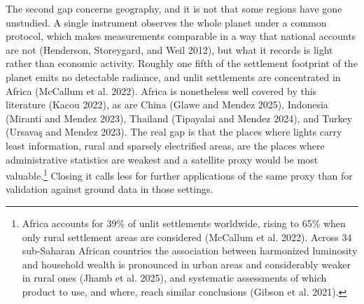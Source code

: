 \documentclass[
  letterpaper,
  DIV=11,
  numbers=noendperiod]{scrartcl}
\begin{document}
The second gap concerns geography, and it is not that some regions have
gone unstudied. A single instrument observes the whole planet under a
common protocol, which makes measurements comparable in a way that
national accounts are not (Henderson, Storeygard, and Weil 2012), but
what it records is light rather than economic activity. Roughly one
fifth of the settlement footprint of the planet emits no detectable
radiance, and unlit settlements are concentrated in Africa (McCallum et
al. 2022). Africa is nonetheless well covered by this literature (Kacou
2022), as are China (Glawe and Mendez 2025), Indonesia (Miranti and
Mendez 2023), Thailand (Tipayalai and Mendez 2024), and Turkey (Ursavaş
and Mendez 2023). The real gap is that the places where lights carry
least information, rural and sparsely electrified areas, are the places
where administrative statistics are weakest and a satellite proxy would
be most valuable.\footnote{Africa accounts for 39\% of unlit settlements
  worldwide, rising to 65\% when only rural settlement areas are
  considered (McCallum et al. 2022). Across 34 sub-Saharan African
  countries the association between harmonized luminosity and household
  wealth is pronounced in urban areas and considerably weaker in rural
  ones (Jhamb et al. 2025), and systematic assessments of which product
  to use, and where, reach similar conclusions (Gibson et al. 2021).}
Closing it calls less for further applications of the same proxy than
for validation against ground data in those settings.
\end{document}
